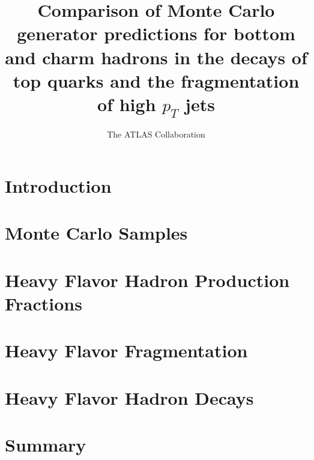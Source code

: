 \documentclass{atlasnote}
\title{Comparison of Monte Carlo generator predictions for bottom and charm hadrons in the decays of top quarks and the fragmentation of high $p_T$ jets}
\author{The ATLAS Collaboration}
\begin{document}
% 
\section{Introduction}
\label{sec:intro}

\section{Monte Carlo Samples}
\label{sec:mcsamples}

\section{Heavy Flavor Hadron Production Fractions}
\label{sec:prod}

\section{Heavy Flavor Fragmentation}
\label{sec:frag}
\label{sec:fragmentation}

\section{Heavy Flavor Hadron Decays}
\label{sec:decay}

\section{Summary}
\label{sec:conclusion}

\clearpage
%
%
%


\end{document}
